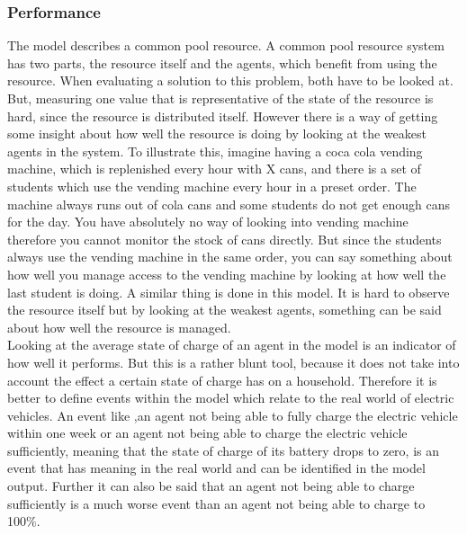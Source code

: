 \documentclass[a4paper]{article}
\begin{document}
\subsubsection{Performance}
The model describes a common pool resource. A common pool resource system has two parts, the resource itself and the agents, 
which benefit from using the resource. When evaluating a solution to this problem, both have to be looked at. But, 
measuring one value that is representative of the state of the resource is hard, since the resource is distributed itself.
However there is a way of getting some insight about how well the resource is doing by looking at the weakest agents in the
system. To illustrate this,
imagine having a coca cola vending machine, which is replenished every hour with X cans, and there is a set of students which 
use the vending machine every hour in a preset order. The machine always runs out of cola cans and some students do not get enough 
cans for the day. You have absolutely no way of looking into vending machine therefore you cannot monitor the stock of cans 
directly. But since the students always use the vending machine in the same order, you can say something about how well
you manage access to the vending machine by looking at how well the last student is doing. A similar thing is done in this model. 
It is hard to observe the resource itself but by looking at the weakest agents, something can be said about how well the resource is 
managed.\\
Looking at the average state of charge of an agent in the model is an indicator of 
how well it performs. But this is a rather blunt tool, because it does not take into account the effect a certain 
state of charge has on a household. 
Therefore it is better to define events within the model which relate 
to the real world of electric vehicles. An event like ,an agent not being able to fully charge the electric vehicle 
within one week or an agent not being able to charge the electric vehicle sufficiently, 
meaning that the state of charge of its battery drops to zero, is an event that has meaning in the real world and can 
be identified in the model output. Further it can also be said that an agent not being able to charge sufficiently is a
much worse event than an agent not being able to charge to 100\%.
\end{document}
